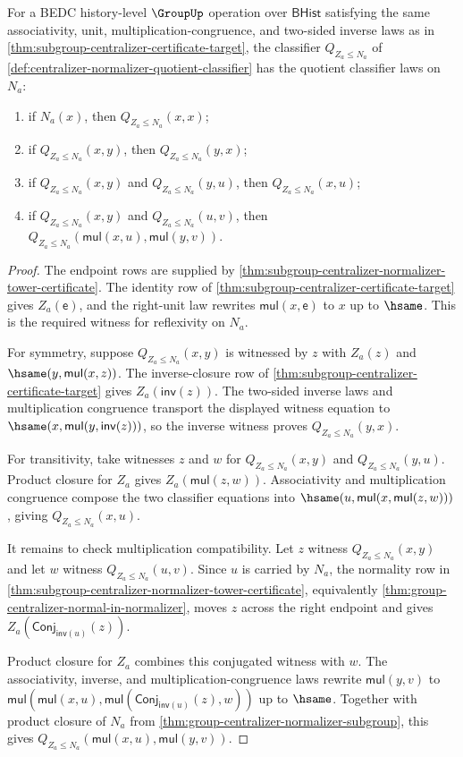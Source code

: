 \begin{theorem}
\label{thm:centralizer-normalizer-quotient-classifier-laws}
For a BEDC history-level $\GroupUp$ operation over $\mathsf{BHist}$ satisfying
the same associativity, unit, multiplication-congruence, and two-sided inverse
laws as in \autoref{thm:subgroup-centralizer-certificate-target}, the
classifier $Q_{Z_a\leq N_a}$ of
\autoref{def:centralizer-normalizer-quotient-classifier} has the quotient
classifier laws on $N_a$:
\begin{enumerate}
\item if $N_a(x)$, then $Q_{Z_a\leq N_a}(x,x)$;
\item if $Q_{Z_a\leq N_a}(x,y)$, then $Q_{Z_a\leq N_a}(y,x)$;
\item if $Q_{Z_a\leq N_a}(x,y)$ and $Q_{Z_a\leq N_a}(y,u)$, then
$Q_{Z_a\leq N_a}(x,u)$;
\item if $Q_{Z_a\leq N_a}(x,y)$ and $Q_{Z_a\leq N_a}(u,v)$, then
$Q_{Z_a\leq N_a}(\mathsf{mul}(x,u),\mathsf{mul}(y,v))$.
\end{enumerate}
\end{theorem}
\begin{proof}
The endpoint rows are supplied by
\autoref{thm:subgroup-centralizer-normalizer-tower-certificate}. The identity
row of \autoref{thm:subgroup-centralizer-certificate-target} gives
$Z_a(\mathsf{e})$, and the right-unit law rewrites
$\mathsf{mul}(x,\mathsf{e})$ to $x$ up to $\hsame$. This is the required
witness for reflexivity on $N_a$.

For symmetry, suppose $Q_{Z_a\leq N_a}(x,y)$ is witnessed by $z$ with
$Z_a(z)$ and $\hsame(y,\mathsf{mul}(x,z))$. The inverse-closure row of
\autoref{thm:subgroup-centralizer-certificate-target} gives
$Z_a(\mathsf{inv}(z))$. The two-sided inverse laws and multiplication
congruence transport the displayed witness equation to
$\hsame(x,\mathsf{mul}(y,\mathsf{inv}(z)))$, so the inverse witness proves
$Q_{Z_a\leq N_a}(y,x)$.

For transitivity, take witnesses $z$ and $w$ for
$Q_{Z_a\leq N_a}(x,y)$ and $Q_{Z_a\leq N_a}(y,u)$. Product closure for $Z_a$
gives $Z_a(\mathsf{mul}(z,w))$. Associativity and multiplication congruence
compose the two classifier equations into
$\hsame(u,\mathsf{mul}(x,\mathsf{mul}(z,w)))$, giving
$Q_{Z_a\leq N_a}(x,u)$.

It remains to check multiplication compatibility. Let $z$ witness
$Q_{Z_a\leq N_a}(x,y)$ and let $w$ witness $Q_{Z_a\leq N_a}(u,v)$. Since
$u$ is carried by $N_a$, the normality row in
\autoref{thm:subgroup-centralizer-normalizer-tower-certificate}, equivalently
\autoref{thm:group-centralizer-normal-in-normalizer}, moves $z$ across the
right endpoint and gives
$Z_a(\mathsf{Conj}_{\mathsf{inv}(u)}(z))$.

Product closure for $Z_a$ combines this conjugated witness with $w$. The
associativity, inverse, and multiplication-congruence laws rewrite
$\mathsf{mul}(y,v)$ to
$\mathsf{mul}(\mathsf{mul}(x,u),
\mathsf{mul}(\mathsf{Conj}_{\mathsf{inv}(u)}(z),w))$ up to $\hsame$.
Together with product closure of $N_a$ from
\autoref{thm:group-centralizer-normalizer-subgroup}, this gives
$Q_{Z_a\leq N_a}(\mathsf{mul}(x,u),\mathsf{mul}(y,v))$.
\end{proof}
